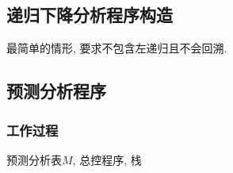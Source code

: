     \subsection{递归下降分析程序构造}

        最简单的情形, 要求不包含左递归且不会回溯. 

    \subsection{预测分析程序}

        \subsubsection{工作过程}

            预测分析表$M$, 总控程序, 栈
